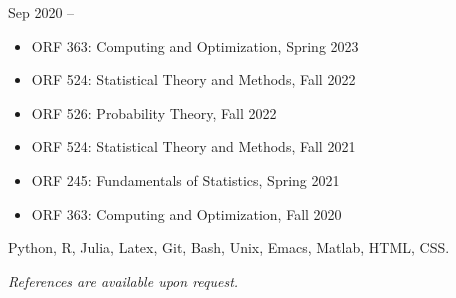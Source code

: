 \documentclass[
  date,
  number,
]{wgu-cv}
\begin{document}


{}
{Sep 2020 --}

\begin{itemize}

  \item
    ORF 363:
    Computing and Optimization,
    Spring 2023

  \item
    ORF 524:
    Statistical Theory and Methods,
    Fall 2022

  \item
    ORF 526:
    Probability Theory,
    Fall 2022

  \item
    ORF 524:
    Statistical Theory and Methods,
    Fall 2021

  \item
    ORF 245:
    Fundamentals of Statistics,
    Spring 2021

  \item
    ORF 363:
    Computing and Optimization,
    Fall 2020

\end{itemize}






Python,
R,
Julia,
Latex,
Git,
Bash,
Unix,
Emacs,
Matlab,
HTML,
CSS.




\emph{References are available upon request.}



\end{document}
